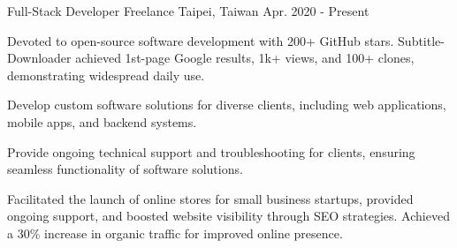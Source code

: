 

\begin{cventries}

  \cventry
    {Full-Stack Developer} %
    {Freelance} %
    {Taipei, Taiwan} %
    {Apr. 2020 - Present} %
    {
      \begin{cvitems} %
        \item {Devoted to open-source software development with 200+ GitHub stars. Subtitle-Downloader achieved 1st-page Google results, 1k+ views, and 100+ clones, demonstrating widespread daily use.}
        \item {Develop custom software solutions for diverse clients, including web applications, mobile apps, and backend systems.}
        \item {Provide ongoing technical support and troubleshooting for clients, ensuring seamless functionality of software solutions.}
        \item {Facilitated the launch of online stores for small business startups, provided ongoing support, and boosted website visibility through SEO strategies. Achieved a 30\% increase in organic traffic for improved online presence.}
      \end{cvitems}
    }


\end{cventries}
